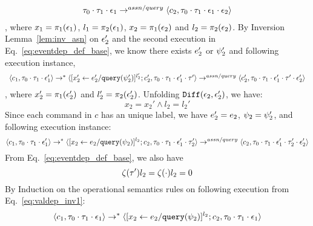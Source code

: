 \begin{subproof}
\begin{equation}
\begin{array}{l}
{  \ensuremath{\mathtt{\tau}}_0 \cdot \ensuremath{\mathtt{\tau}}_1 \cdot \ensuremath{\mathtt{\epsilon}}_1} 
  \rightarrow^{assn/query} 
  \langle {c}_2,  \mathtt{\tau}_0 \cdot \mathtt{\tau}_1 \cdot \mathtt{\epsilon}_1 \cdot \mathtt{\epsilon}_2 \rangle 
\end{array}
\end{equation}
%
, where $x_1 = \pi_1(\mathtt{\epsilon}_1)$, $l_1 = {\pi_2(\mathtt{\epsilon}_1)}$, $x_2 = \pi_1(\mathtt{\epsilon}_2)$ and $l_2 = \pi_2(\mathtt{\epsilon}_2)$.
%
By Inversion Lemma~\ref{lem:inv_asn} on 
$\mathtt{\epsilon}_2'$ and the second execution in Eq.~\ref{eq:eventdep_def_base},
we know there exists $e_2'$ or $\psi_2'$ and following execution instance,
 \[
  \begin{array}{l}   
  \langle c_1, \mathtt{\tau}_0 \cdot \mathtt{\tau}_1 \cdot \mathtt{\epsilon}_1' \rangle 
  \rightarrow^{*} 
  \langle [\mathrel{ {x}_2' \leftarrow e_2' / {\tt query}(\psi_2') }]^{l_2'} ; {c}_2', \mathtt{\tau}_0 \cdot \mathtt{\tau}_1 \cdot \mathtt{\epsilon}_1' \cdot \mathtt{\tau}' \rangle 
  \rightarrow^{assn/query} 
  \langle {c}_2',  \mathtt{\tau}_0 \cdot \mathtt{\tau}_1 \cdot \mathtt{\epsilon}_1' \cdot \mathtt{\tau}' \cdot \mathtt{\epsilon}_2' \rangle 
\end{array}
 \]
 , where  $x_2' = \pi_1(\mathtt{\epsilon}_2')$ and $l_2' = \pi_2(\mathtt{\epsilon}_2')$.
%
Unfolding $\mathtt{Diff}(\mathtt{\epsilon}_2,\mathtt{\epsilon}_2')$, we have:
\[
  x_2 = x_2' \land l_2 = l_2' 
\] 
%
Since each command in $c$ has an unique label, we have $e_2' = e_2$, $\psi_2 = \psi_2'$, and following execution instance:
\begin{equation}
\label{eq:valdep_inv2}
  \langle c_1, \mathtt{\tau}_0 \cdot \mathtt{\tau}_1 \cdot \mathtt{\epsilon}_1' \rangle 
  \rightarrow^{*} 
  \langle [\mathrel{ {x}_2 \leftarrow e_2 / {\tt query}(\psi_2) }]^{l_2} ; {c}_2, \mathtt{\tau}_0 \cdot \mathtt{\tau}_1 \cdot \mathtt{\epsilon}_1' \cdot \mathtt{\tau}_2' \rangle 
  \rightarrow^{assn/query} 
  \langle {c}_2,  \mathtt{\tau}_0 \cdot \mathtt{\tau}_1 \cdot \mathtt{\epsilon}_1' \cdot \mathtt{\tau}_2' \cdot \mathtt{\epsilon}_2' \rangle 
\end{equation}
%
From Eq.~\ref{eq:eventdep_def_base}, we also have
\begin{equation}
\label{eq:valdep_invn}
  \mathtt{\zeta}(\mathtt{\tau}') l_2 = \mathtt{\zeta}( \cdot ) l_2 = 0
\end{equation}
%
%
By Induction on the operational semantics rules on following execution from Eq.~\ref{eq:valdep_inv1}: 
 \[\langle c_1, \mathtt{\tau}_0 \cdot \mathtt{\tau}_1 \cdot \mathtt{\epsilon}_1 \rangle
  \rightarrow^{*} 
  \langle [\mathrel{ {x}_2 \leftarrow e_2 / {\tt query}(\psi_2) }]^{l_2};{c}_2, 
  \mathtt{\tau}_0 \cdot \mathtt{\tau}_1 \cdot \mathtt{\epsilon}_1 \rangle 
\]
\end{subproof}

